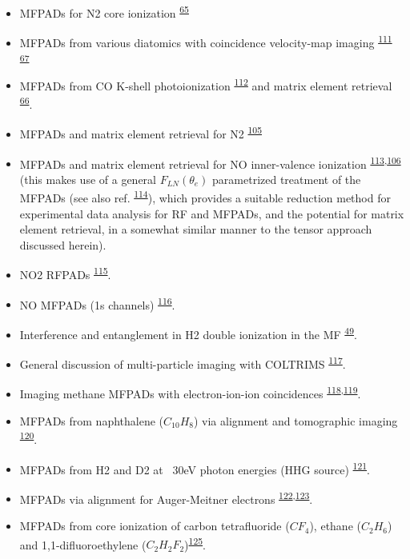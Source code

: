 \documentclass[10pt]{article}
\begin{document}
\begin{itemize}
\item MFPADs for N2 core ionization \textsuperscript{\hyperref[csl:65]{65}}
\item MFPADs from various diatomics with coincidence velocity-map imaging \textsuperscript{\hyperref[csl:111]{111}} \textsuperscript{\hyperref[csl:67]{67}}
\item MFPADs from CO K-shell photoionization \textsuperscript{\hyperref[csl:112]{112}} and matrix element retrieval \textsuperscript{\hyperref[csl:66]{66}}.
\item MFPADs and matrix element retrieval for N2 \textsuperscript{\hyperref[csl:105]{105}}
\item MFPADs and matrix element retrieval for NO inner-valence ionization \textsuperscript{\hyperref[csl:113]{113},\hyperref[csl:106]{106}} (this makes use of a general $F_{LN}(\theta_e)$ parametrized treatment of the MFPADs (see also ref. \textsuperscript{\hyperref[csl:114]{114}}), which provides a suitable reduction method for experimental data analysis for RF and MFPADs, and the potential for matrix element retrieval, in a somewhat similar manner to the tensor approach discussed herein). %
\item NO2 RFPADs \textsuperscript{\hyperref[csl:115]{115}}.
\item NO MFPADs (1s channels) \textsuperscript{\hyperref[csl:116]{116}}.
\item Interference and entanglement in H2 double ionization in the MF \textsuperscript{\hyperref[csl:49]{49}}.
\item General discussion of multi-particle imaging with COLTRIMS \textsuperscript{\hyperref[csl:117]{117}}.
\item Imaging methane MFPADs with electron-ion-ion coincidences \textsuperscript{\hyperref[csl:118]{118},\hyperref[csl:119]{119}}.
\item MFPADs from naphthalene ($C_{10}H_{8}$) via alignment and tomographic imaging \textsuperscript{\hyperref[csl:120]{120}}.
\item MFPADs from H2 and D2 at ~30eV photon energies (HHG source) \textsuperscript{\hyperref[csl:121]{121}}.
\item MFPADs via alignment for Auger-Meitner electrons \textsuperscript{\hyperref[csl:122]{122},\hyperref[csl:123]{123}}.
\item MFPADs from core ionization of carbon tetrafluoride ($CF_4$), ethane ($C_2H_6$) and 1,1-difluoroethylene ($C_2 H_2 F_2$)\textsuperscript{\hyperref[csl:125]{125}}.
\end{itemize}
\end{document}

